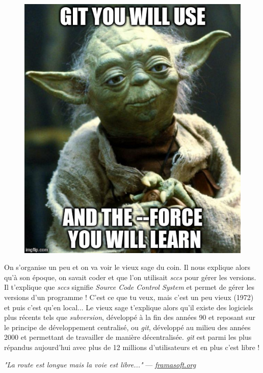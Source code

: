 \documentclass[12pt,a4paper]{article}
\begin{document}
\begin{figure}
\vspace*{-2.6\baselineskip}
\includegraphics[width=\linewidth]{yoda_git}
\end{figure}
On s'organise un peu et on va voir le vieux sage du coin. Il nous explique alors qu'à son époque, on savait coder et que l'on utilisait \emph{sccs} pour gérer les versions. Il t'explique que \emph{sccs} signifie \emph{Source Code Control System} et permet de gérer les versions d'un programme ! C'est ce que tu veux, mais c'est un peu vieux (1972) et puis c'est qu'en local... Le vieux sage t'explique alors qu'il existe des logiciels plus récents tels que \emph{subversion}, développé à la fin des années 90 et reposant sur le principe de développement centralisé, ou \emph{git}, développé au milieu des années 2000 et permettant de travailler de manière décentralisée. \emph{git} est parmi les plus répandus aujourd'hui avec plus de 12 millions d'utilisateurs et en plus c'est libre !

\emph{"La route est longue mais la voie est libre..."} --- \emph{\href{https://framasoft.org/}{framasoft.org}}
\end{document}
